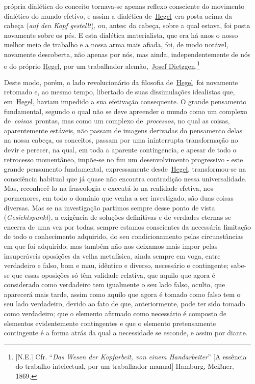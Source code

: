 própria dialética do conceito tornava-se apenas reflexo consciente do
movimento dialético do mundo efetivo, e assim a dialética
de~\href{https://www.marxists.org/portugues/dicionario/verbetes/h/hegel.htm}{Hegel}~era
posta acima da cabeça (\emph{auf den Kopf gestellt}), ou, antes: da
cabeça, sobre a qual estava, foi posta novamente sobre os pés. E esta
dialética materialista, que era há anos o nosso melhor meio de trabalho
e a nossa arma mais afiada, foi, de modo notável, novamente descoberta,
não apenas por nós, mas ainda, independentemente de nós e do próprio
\href{https://www.marxists.org/portugues/dicionario/verbetes/h/hegel.htm}{Hegel},
por um trabalhador
alemão,~\href{https://www.marxists.org/portugues/dicionario/verbetes/d/dietzgen_jseph.htm}{Josef
Dietzgen}.\footnote{{[}N.E.{]} Cfr. ``\emph{Das Wesen der Kopfarbeit,
  von einem Handarbeiter}'' {[}A essência do trabalho intelectual, por
  um trabalhador manual{]} Hamburg, Meißner, 1869,}
\protect\hypertarget{r30}{}{}

Deste modo, porém, o lado revolucionário da filosofia
de~\href{https://www.marxists.org/portugues/dicionario/verbetes/h/hegel.htm}{Hegel}~foi
novamente retomado e, ao mesmo tempo, libertado de suas dissimulações
idealistas que,
em~\href{https://www.marxists.org/portugues/dicionario/verbetes/h/hegel.htm}{Hegel},
haviam impedido a sua efetivação consequente. O grande pensamento
fundamental, segundo o qual não se deve apreender o mundo como um
complexo de~\emph{coisas~}prontas, mas como um complexo
de~\emph{processos}, no qual as coisas, aparentemente estáveis, não
passam de imagens derivadas do pensamento delas na nossa cabeça, os
conceitos, passam por uma ininterrupta transformação no devir e perecer,
na qual, em toda a aparente contingencia, e apesar de todo o retrocesso
momentâneo, impõe-se no fim um desenvolvimento progressivo - este grande
pensamento fundamental, expressamente
desde~\href{https://www.marxists.org/portugues/dicionario/verbetes/h/hegel.htm}{Hegel},
transformou-se na consciência habitual que já quase não encontra
contradição nessa universalidade. Mas, reconhecê-lo na fraseologia e
executá-lo na realidade efetiva, nos pormenores, em todo o domínio que
venha a ser investigado, são duas coisas diversas. Mas se na
investigação partimos sempre desse ponto de vista
(\emph{Gesichtspunkt}), a exigência de soluções definitivas e de
verdades eternas se encerra de uma vez por todas; sempre estamos
conscientes da necessária limitação de todo o conhecimento adquirido, do
seu condicionamento pelas circunstâncias em que foi adquirido; mas
também não nos deixamos mais impor pelas insuperáveis oposições da velha
metafísica, ainda sempre em voga, entre verdadeiro e falso, bom e mau,
idêntico e diverso, necessário e contingente; sabe-se que essas
oposições só têm validade relativa, que aquilo que agora é considerado
como verdadeiro tem igualmente o seu lado falso, oculto, que aparecerá
mais tarde, assim como aquilo que agora é tomado como falso tem o seu
lado verdadeiro, devido ao fato de que, anteriormente, pode ter sido
tomado como verdadeiro; que o elemento afirmado como necessário é
composto de elementos evidentemente contingentes e que o elemento
pretensamente contingente é a forma atrás da qual a necessidade se
esconde, e assim por diante.

